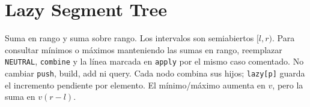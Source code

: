 \section{Lazy Segment Tree}

Suma en rango y suma sobre rango. Los intervalos son semiabiertos $[l,r)$.
Para consultar m\'inimos o m\'aximos manteniendo las sumas en rango, reemplazar
\texttt{NEUTRAL}, \texttt{combine} y la l\'inea marcada en \texttt{apply}
por el mismo caso comentado. No cambiar \texttt{push}, build, add ni query.
Cada nodo combina sus hijos; \texttt{lazy[p]} guarda el incremento pendiente
por elemento. El m\'inimo/m\'aximo aumenta en $v$, pero la suma en $v(r-l)$.


